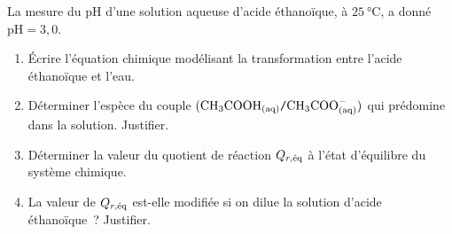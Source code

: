 La mesure du $\mathrm{pH}$ d'une solution aqueuse d'acide éthano\"ique, à
$\qty{25}{\degreeCelsius}$, a donné $\mathrm{pH}=3,0$.

\begin{enumerate}
    \item Écrire l'équation chimique modélisant la transformation entre l'acide
          éthanoïque et l'eau.
    \item Déterminer l'espèce du couple
          $(\ce{CH3COOH_{(aq)}}\ttslash{}\ce{CH3COO^-_{(aq)}})$ qui prédomine
          dans la solution. Justifier.
    \item Déterminer la valeur du quotient de réaction $Q_{r,\eq}$ à l'état
          d'équilibre du système chimique.
    \item La valeur de $Q_{r,\eq}$ est-elle modifiée si on dilue la solution
          d'acide éthanoïque~? Justifier.
\end{enumerate}


